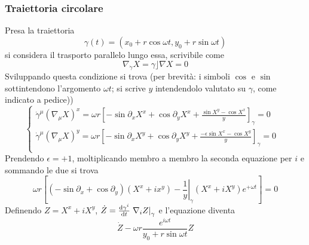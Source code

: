\subsubsection{Traiettoria circolare}
Presa la traiettoria
\[ \gamma(t) = (x_0 + r\cos\omega t, y_0 + r\sin\omega t) \]
si considera il trasporto parallelo lungo essa, scrivibile come
\[ \nabla_{\dot{\gamma}} X = \gamma \rfloor \nabla X = 0 \]
Sviluppando questa condizione si trova (per brevit\`a: i simboli $\cos$ e $\sin$ sottintendono l'argomento $\omega t$; si scrive $y$ intendendolo valutato su $\gamma$, come indicato a pedice))
\[ \begin{cases}
	\dot{\gamma}^\mu (\nabla_\mu X)^x = \omega r \left[ -\sin \partial_x X^x + \cos \partial_y X^x
		+\frac{\sin X^y - \cos X^x}{y}\right]_\gamma = 0  & \\
	\dot{\gamma}^\mu (\nabla_\mu X)^y = \omega r \left[ -\sin \partial_x X^y + \cos \partial_y X^y
		+\frac{-\epsilon\sin X^x - \cos X^y}{y}\right]_\gamma = 0  & \\
   \end{cases}
\]
Prendendo \(\epsilon=+1\), moltiplicando membro a membro la seconda equazione per $i$ e sommando le due si trova
\[\omega r\left[(-\sin \partial_x+\cos \partial_y)(X^x+ix^y) - \left.\frac{1}{y}\right|_\gamma (X^x+iX^y) e^{+\omega t}\right] = 0 \]
Definendo \( Z = X^x +iX^y \), \(\dot{Z} = \frac{\mathrm{d} \gamma^i}{\mathrm{d} t}\left.\nabla_i Z \right|_\gamma\) e l'equazione diventa
\[ \dot{Z} - \omega r \frac{e^{i\omega t}}{y_0 + r\sin{\omega t}} Z \]
